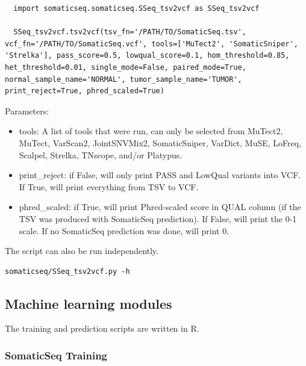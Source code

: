 \documentclass[10pt,letterpaper]{article}
\begin{document}
\begin{sloppypar}
\begin{lstlisting}
  import somaticseq.somaticseq.SSeq_tsv2vcf as SSeq_tsv2vcf
  
  SSeq_tsv2vcf.tsv2vcf(tsv_fn='/PATH/TO/SomaticSeq.tsv', vcf_fn='/PATH/TO/SomaticSeq.vcf', tools=['MuTect2', 'SomaticSniper', 'Strelka'], pass_score=0.5, lowqual_score=0.1, hom_threshold=0.85, het_threshold=0.01, single_mode=False, paired_mode=True, normal_sample_name='NORMAL', tumor_sample_name='TUMOR', print_reject=True, phred_scaled=True)
\end{lstlisting}

Parameters:

\begin{itemize}

\item tools: A list of tools that were run, can only be selected from MuTect2, MuTect, VarScan2, JointSNVMix2, SomaticSniper, VarDict, MuSE, LoFreq, Scalpel, Strelka, TNscope, and/or Platypus. 

\item print\_reject: if False, will only print PASS and LowQual variants into VCF. If True, will print everything from TSV to VCF. 

\item phred\_scaled: if True, will print Phred-scaled score in QUAL column (if the TSV was produced with SomaticSeq prediction). If False, will print the 0-1 scale. If no SomaticSeq prediction was done, will print 0. 


\end{itemize}

The script can also be run independently. 

\begin{lstlisting}
somaticseq/SSeq_tsv2vcf.py -h
\end{lstlisting}





\subsection{Machine learning modules} \label{module:machine_learning}

The training and prediction scripts are written in R.

\subsubsection{SomaticSeq Training} \label{module:training}


\end{sloppypar}
\end{document}
